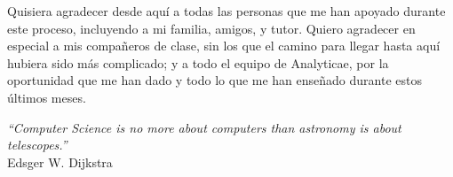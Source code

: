 \documentclass[twoside, openright]{report}
\begin{document}
	
	
	\paginavacia
	
	\paginavacia
	
	\thispagestyle{plain}
	\vspace*{\fill}
	Quisiera agradecer desde aquí a todas las personas que me han apoyado durante este proceso, incluyendo a mi familia, amigos, y tutor. Quiero agradecer en especial a mis compañeros de clase, sin los que el camino para llegar hasta aquí hubiera sido más complicado; y a todo el equipo de Analyticae, por la oportunidad que me han dado y todo lo que me han enseñado durante estos últimos meses.\\
	\vspace{3cm}
	\begin{flushright}
		\emph{``Computer Science is no more about computers than astronomy is about telescopes.''}\\ Edsger W. Dijkstra
	\end{flushright}
	\vspace*{\fill}
	
	
	
	
	\tableofcontents
	\listoffigures
	\listofalgorithms
	\listoftables
	
	\glsaddall\printglossary[type = \acronymtype, title = {Acrónimos y siglas}]
	
	
	
	
	\pagestyle{mypagestyle}
	
	
	
	
	\pagestyle{plain}
	\printbibliography
	
	\appendix
	
	
	
	
\end{document}
